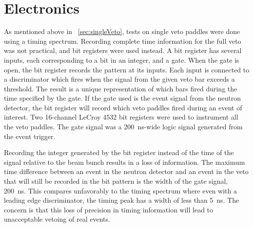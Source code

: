 \section{Electronics}

As mentioned above in {\sect}~\ref{sec:singleVeto}, tests on single veto paddles were done using a timing spectrum.  Recording complete time information for the full veto was not practical, and bit registers were used instead.  A bit register has several inputs, each corresponding to a bit in an integer, and a gate.  When the gate is open, the bit register records the pattern at its inputs.  Each input is connected to a discriminator which fires when the signal from the given veto bar exceeds a threshold.  The result is a unique representation of which bars fired during the time specified by the gate.  If the gate used is the event signal from the neutron detector, the bit register will record which veto paddles fired during an event of interest.  Two 16-channel LeCroy 4532 bit registers were used to instrument all the veto paddles.  The gate signal was a 200~ns-wide logic signal generated from the event trigger.

Recording the integer generated by the bit register instead of the time of the signal relative to the beam bunch results in a loss of information.  The maximum time difference between an event in the neutron detector and an event in the veto that will still be recorded in the bit pattern is the width of the gate signal, 200~ns.  This compares unfavorably to the timing spectrum where even with a leading edge discriminator, the timing peak has a width of less than 5~ns.  The concern is that this loss of precision in timing information will lead to unacceptable vetoing of real events.  

